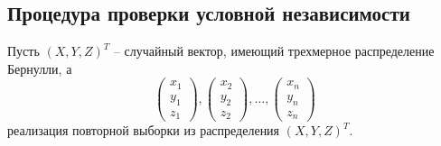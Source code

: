 \newpage
\subsection{Процедура проверки условной независимости}

Пусть $(X,Y,Z)^T$ -- случайный вектор, имеющий трехмерное распределение
Бернулли, а
$$
\begin{pmatrix}
        x_1 \\
        y_1 \\
        z_1
    \end{pmatrix},
    \begin{pmatrix}
        x_2 \\
        y_2 \\
        z_2
    \end{pmatrix}, \ldots,
    \begin{pmatrix}
        x_n \\
        y_n \\
        z_n
    \end{pmatrix}
$$ реализация повторной выборки из распределения $(X,Y,Z)^T$.

